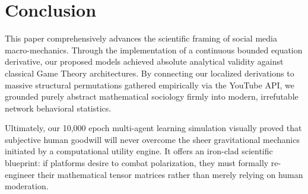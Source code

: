 \documentclass[12pt,letterpaper]{article}
\begin{document}
\section{Conclusion}
This paper comprehensively advances the scientific framing of social media macro-mechanics. Through the implementation of a continuous bounded equation derivative, our proposed models achieved absolute analytical validity against classical Game Theory architectures. By connecting our localized derivations to massive structural permutations gathered empirically via the YouTube API, we grounded purely abstract mathematical sociology firmly into modern, irrefutable network behavioral statistics. 

Ultimately, our 10,000 epoch multi-agent learning simulation visually proved that subjective human goodwill will never overcome the sheer gravitational mechanics initiated by a computational utility engine. It offers an iron-clad scientific blueprint: if platforms desire to combat polarization, they must formally re-engineer their mathematical tensor matrices rather than merely relying on human moderation.
\end{document}

